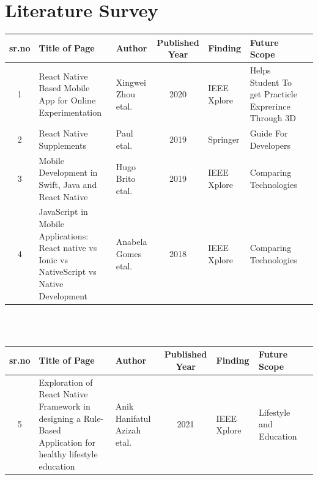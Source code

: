 \documentclass[12pt,a4paper]{report}
\begin{document}
\newpage

\chapter{Literature Survey}


\begin{tabular}{ |c | m{2.5cm} | m{2cm}| c | m{2cm} | m{2cm} | c | }

  \hline
  sr.no & Title of Page & Author & Published Year & Finding & Future Scope  \\ 
  \hline
  1 & React Native Based Mobile App for Online Experimentation & Xingwei Zhou etal. &  2020 & IEEE Xplore & Helps Student To  get Practicle Exprerince Through 3D \\
  \hline
  2 & React Native Supplements & Paul etal. &  2019 & Springer & Guide For Developers \\ 
\hline
    3 &  Mobile Development in Swift, Java and React Native & Hugo Brito etal. &  2019 & IEEE Xplore & Comparing Technologies \\
\hline 
 4 &  JavaScript in Mobile Applications: React native vs Ionic vs NativeScript vs Native Development & Anabela Gomes etal. &  2018 & IEEE Xplore & Comparing Technologies \\
\hline 

\end{tabular}
\\
\\

\newpage
\begin{tabular}{ |c | m{2.5cm} | m{2cm}| c | m{2cm} | m{2cm} | c | }

  \hline
  sr.no & Title of Page & Author & Published Year & Finding & Future Scope  \\ 
  \hline
 5 &  Exploration of React Native Framework in designing a Rule-Based Application for healthy lifestyle education & Anik Hanifatul Azizah etal. &  2021 & IEEE Xplore & Lifestyle and Education \\
\hline 
  
\end{tabular}
\end{document}
